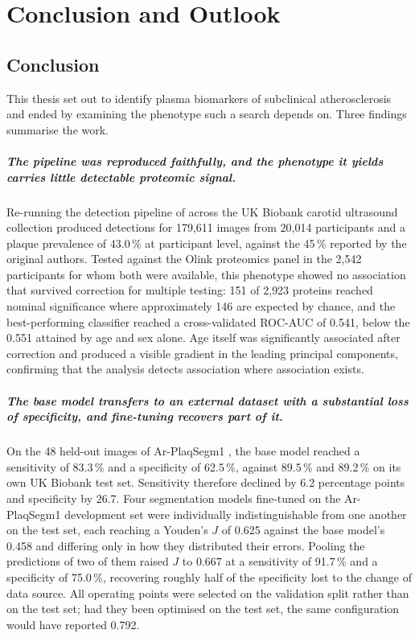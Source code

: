\chapter{Conclusion and Outlook}
\label{ch:conclusion}

\section{Conclusion}
\label{sec:conclusion}

This thesis set out to identify plasma biomarkers of subclinical atherosclerosis and ended by
examining the phenotype such a search depends on. Three findings summarise the work.

\paragraph{The pipeline was reproduced faithfully, and the phenotype it yields carries little
detectable proteomic signal.}
Re-running the detection pipeline of \textcite{omarov2024deep} across the UK Biobank carotid
ultrasound collection produced detections for 179{,}611 images from 20{,}014 participants and a
plaque prevalence of 43.0\,\% at participant level, against the 45\,\% reported by the original
authors. Tested against the Olink proteomics panel in the 2{,}542 participants for whom both were
available, this phenotype showed no association that survived correction for multiple testing:
151 of 2{,}923 proteins reached nominal significance where approximately 146 are expected by
chance, and the best-performing classifier reached a cross-validated ROC-AUC of 0.541, below the
0.551 attained by age and sex alone. Age itself was significantly associated after correction and
produced a visible gradient in the leading principal components, confirming that the analysis
detects association where association exists.

\paragraph{The base model transfers to an external dataset with a substantial loss of
specificity, and fine-tuning recovers part of it.}
On the 48 held-out images of Ar-PlaqSegm1 \cite{rulloni2025arplaqsegm1}, the base model
reached a sensitivity of 83.3\,\% and a specificity of 62.5\,\%, against 89.5\,\% and 89.2\,\%
on its own UK Biobank test set. Sensitivity therefore declined by 6.2 percentage points and
specificity by 26.7. Four segmentation models fine-tuned on the Ar-PlaqSegm1 development set
were individually indistinguishable from one another on the test set, each reaching a Youden's
$J$ of 0.625 against the base model's 0.458 and differing only in how they distributed their
errors. Pooling the predictions of two of them raised $J$ to 0.667 at a sensitivity of 91.7\,\%
and a specificity of 75.0\,\%, recovering roughly half of the specificity lost to the change of
data source. All operating points were selected on the validation split rather than on the test
set; had they been optimised on the test set, the same configuration would have reported 0.792.

